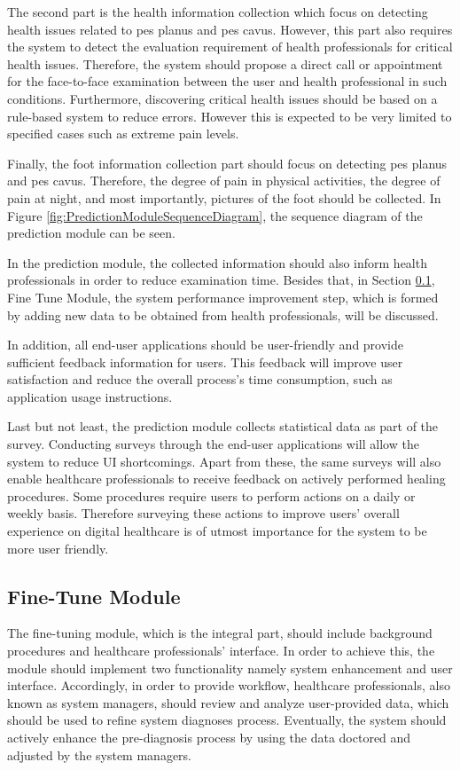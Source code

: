 The second part is the health information collection which focus on detecting health issues related to pes planus and pes cavus. However, this part also requires the system to detect the evaluation requirement of health professionals for critical health issues. Therefore, the system should propose a direct call or appointment for the face-to-face examination between the user and health professional in such conditions. Furthermore, discovering critical health issues should be based on a rule-based system to reduce errors. However this is expected to be very limited to specified cases such as extreme pain levels.

Finally, the foot information collection part should focus on detecting pes planus and pes cavus. Therefore, the degree of pain in physical activities, the degree of pain at night, and most importantly, pictures of the foot should be collected. In Figure \ref{fig:PredictionModuleSequenceDiagram}, the sequence diagram of the prediction module can be seen.

In the prediction module, the collected information should also inform health professionals in order to reduce examination time. Besides that, in Section \ref{sec:FineTuneModule}, Fine Tune Module, the system performance improvement step, which is formed by adding new data to be obtained from health professionals, will be discussed.

In addition, all end-user applications should be user-friendly and provide sufficient feedback information for users. This feedback will improve user satisfaction and reduce the overall process's time consumption, such as application usage instructions.

Last but not least, the prediction module collects statistical data as part of the survey. Conducting surveys through the end-user applications will allow the system to reduce UI shortcomings. Apart from these, the same surveys will also enable healthcare professionals to receive feedback on actively performed healing procedures. Some procedures require users to perform actions on a daily or weekly basis. Therefore surveying these actions to improve users' overall experience on digital healthcare is of utmost importance for the system to be more user friendly.

\subsection{ Fine-Tune Module }\label{sec:FineTuneModule}

The fine-tuning module, which is the integral part, should include background procedures and healthcare professionals' interface. In order to achieve this, the module should implement two functionality namely system enhancement and user interface. Accordingly, in order to provide workflow, healthcare professionals, also known as system managers, should review and analyze user-provided data, which should be used to refine system diagnoses process. Eventually, the system should actively enhance the pre-diagnosis process by using the data doctored and adjusted by the system managers.

